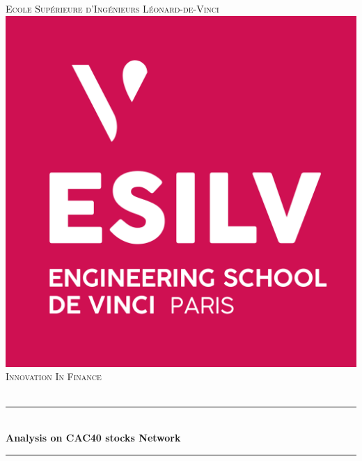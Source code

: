 \documentclass[12pt]{article}
\begin{document}
\begin{titlepage}
\newcommand{\HRule}{\rule{\linewidth}{0.5mm}} %
\center %

\textsc{\LARGE Ecole Supérieure d'Ingénieurs Léonard-de-Vinci}\\[1cm]
\includegraphics[scale=.4]{logo_esilv.png}\\[1cm]
\textsc{\Large Innovation In Finance}\\[0.5cm]
\textsc{\large }\\[0.5cm]
\HRule \\[0.4cm]
{ \huge \bfseries Analysis on CAC40 stocks Network}\\[0.4cm]
\HRule \\[0.5cm]

\end{titlepage}
\end{document}
